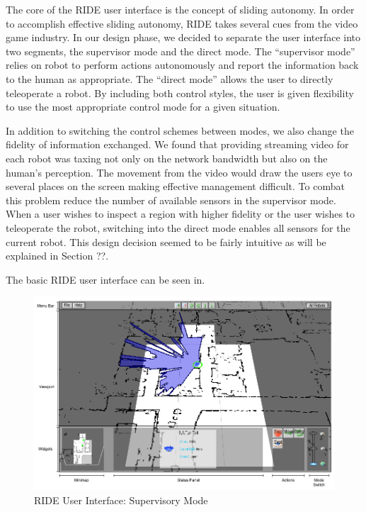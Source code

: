 The core of the RIDE user interface is the concept of sliding autonomy. In order to accomplish effective sliding autonomy, RIDE takes several cues from the video game industry. In our design phase, we decided to separate the user interface into two segments, the supervisor mode and the direct mode. The ``supervisor mode'' relies on robot to perform actions autonomously and report the information back to the human as appropriate. The ``direct mode'' allows the user to directly teleoperate a robot. By including both control styles, the user is given flexibility to use the most appropriate control mode for a given situation.

In addition to switching the control schemes between modes, we also change the fidelity of information exchanged. We found that providing streaming video for each robot was taxing not only on the network bandwidth but also on the human's perception. The movement from the video would draw the users eye to several places on the screen making effective management difficult. To combat this problem reduce the number of available sensors in the supervisor mode. When a user wishes to inspect a region with higher fidelity or the user wishes to teleoperate the robot, switching into the direct mode enables all sensors for the current robot. This design decision seemed to be fairly intuitive as will be explained in Section ??.

The basic RIDE user interface can be seen in.
\begin{figure}[ht]
\begin{center}
\includegraphics[width=6.10in]{images/ride-ui.png}
\caption{RIDE User Interface: Supervisory Mode\label{fig:ride-ui}}
\end{center}
\end{figure}


